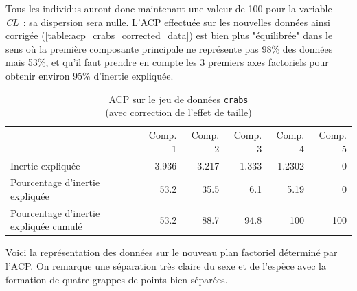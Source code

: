 \documentclass[a4paper,11pt]{report}
\begin{document}
Tous les individus auront donc maintenant une valeur de 100 pour la variable \textit{CL}~: sa dispersion sera nulle. L'ACP effectuée sur les nouvelles données ainsi corrigée (\autoref{table:acp_crabs_corrected_data}) est bien plus "équilibrée" dans le sens où la première composante principale ne représente pas 98\% des données mais 53\%, et qu'il faut prendre en compte les 3 premiers axes factoriels pour obtenir environ 95\% d'inertie expliquée.



\begin{table}[H]
	\centering
	\captionsetup{justification=centering, margin=2cm}
	\caption{ACP sur le jeu de données \texttt{crabs} \\(avec correction de l'effet de taille)}
	\label{table:acp_crabs_corrected_data}
	\begin{tabular}{lrrrrr}
		& Comp. 1 & Comp. 2 & Comp. 3 & Comp. 4 & Comp. 5 \\
		Inertie expliquée & 3.936 & 3.217 & 1.333 & 1.2302 & 0 \\
		Pourcentage d'inertie expliquée & 53.2 & 35.5 & 6.1 & 5.19 & 0 \\
		Pourcentage d'inertie expliquée cumulé & 53.2 & 88.7 & 94.8 & 100 & 100
	\end{tabular}
\end{table}



Voici la représentation des données sur le nouveau plan factoriel déterminé par l'ACP. On remarque une séparation très claire du sexe et de l'espèce avec la formation de quatre grappes de points bien séparées.
\end{document}
